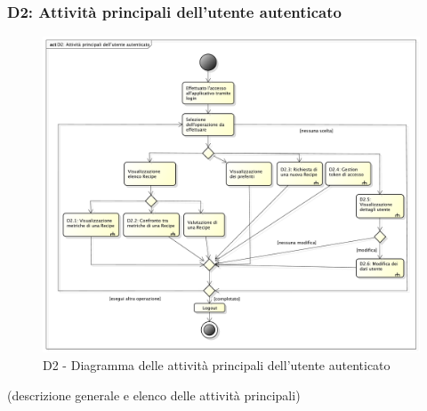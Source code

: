 		\subsubsection{D2: Attività principali dell'utente autenticato} %
		\label{ssub:attivita_principali_dell_utente_autenticato}
		\begin{figure}[!htbp]
			\centering
			\centerline{\includegraphics[scale=0.41]{./images/D2.pdf}}
			\caption{D2 - Diagramma delle attività principali dell'utente autenticato}
		\end{figure}
		\noindent
		[TO DO] (descrizione generale e elenco delle attività principali)


